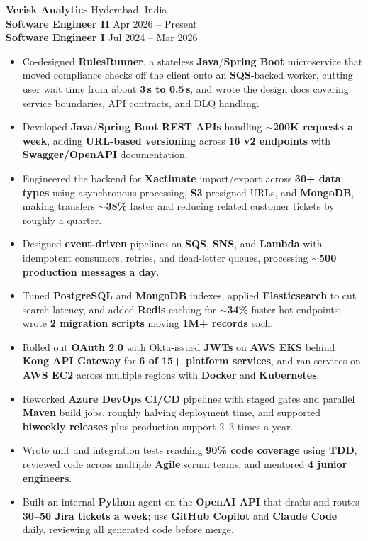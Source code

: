 \documentclass[a4paper,10pt]{article}
\begin{document}
\textbf{Verisk Analytics} \hfill Hyderabad, India \\
\textbf{Software Engineer II} \hfill Apr 2026 -- Present \\
\textbf{Software Engineer I} \hfill Jul 2024 -- Mar 2026

\begin{itemize}[leftmargin=*]
    \item Co-designed \textbf{RulesRunner}, a stateless \textbf{Java}/\textbf{Spring Boot} microservice that moved compliance checks off the client onto an \textbf{SQS}-backed worker, cutting user wait time from about \textbf{3\,s to 0.5\,s}, and wrote the design docs covering service boundaries, API contracts, and DLQ handling.
    \item Developed \textbf{Java}/\textbf{Spring Boot} \textbf{REST APIs} handling ${\sim}$\textbf{200K requests a week}, adding \textbf{URL-based versioning} across \textbf{16 v2 endpoints} with \textbf{Swagger/OpenAPI} documentation.
    \item Engineered the backend for \textbf{Xactimate} import/export across \textbf{30+ data types} using asynchronous processing, \textbf{S3} presigned URLs, and \textbf{MongoDB}, making transfers ${\sim}$\textbf{38\%} faster and reducing related customer tickets by roughly a quarter.
    \item Designed \textbf{event-driven} pipelines on \textbf{SQS}, \textbf{SNS}, and \textbf{Lambda} with idempotent consumers, retries, and dead-letter queues, processing ${\sim}$\textbf{500 production messages a day}.
    \item Tuned \textbf{PostgreSQL} and \textbf{MongoDB} indexes, applied \textbf{Elasticsearch} to cut search latency, and added \textbf{Redis} caching for ${\sim}$\textbf{34\%} faster hot endpoints; wrote \textbf{2 migration scripts} moving \textbf{1M+ records} each.
    \item Rolled out \textbf{OAuth 2.0} with Okta-issued \textbf{JWTs} on \textbf{AWS EKS} behind \textbf{Kong API Gateway} for \textbf{6 of 15+ platform services}, and ran services on \textbf{AWS EC2} across multiple regions with \textbf{Docker} and \textbf{Kubernetes}.
    \item Reworked \textbf{Azure DevOps} \textbf{CI/CD} pipelines with staged gates and parallel \textbf{Maven} build jobs, roughly halving deployment time, and supported \textbf{biweekly releases} plus production support 2--3 times a year.
    \item Wrote unit and integration tests reaching \textbf{90\% code coverage} using \textbf{TDD}, reviewed code across multiple \textbf{Agile} scrum teams, and mentored \textbf{4 junior engineers}.
    \item Built an internal \textbf{Python} agent on the \textbf{OpenAI API} that drafts and routes \textbf{30--50 Jira tickets a week}; use \textbf{GitHub Copilot} and \textbf{Claude Code} daily, reviewing all generated code before merge.
\end{itemize}
\end{document}
